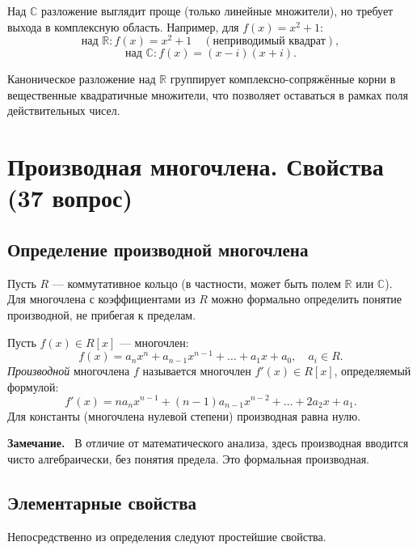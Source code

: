 \documentclass[a4paper,12pt]{article}
\newcommand{\myremark}{\textbf{Замечание.}\ }
\theoremstyle{definition}
\theoremstyle{plain}
\theoremstyle{remark}
\begin{document}
	Над \(\mathbb{C}\) разложение выглядит проще (только линейные множители), но требует выхода в комплексную область. Например, для \(f(x) = x^2 + 1\):
	\[
	\text{над } \mathbb{R}: f(x) = x^2 + 1 \quad (\text{неприводимый квадрат}),
	\]
	\[
	\text{над } \mathbb{C}: f(x) = (x - i)(x + i).
	\]
	
	Каноническое разложение над \(\mathbb{R}\) группирует комплексно-сопряжённые корни в вещественные квадратичные множители, что позволяет оставаться в рамках поля действительных чисел.
	
	
	
	
	
	
	\newpage
	\section{Производная многочлена. Свойства (37 вопрос)}
	
	\subsection{Определение производной многочлена}
	
	Пусть \( R \) — коммутативное кольцо (в частности, может быть полем \(\mathbb{R}\) или \(\mathbb{C}\)). Для многочлена с коэффициентами из \( R \) можно формально определить понятие производной, не прибегая к пределам.
	
	\begin{tcolorbox}[colback=blue!5, colframe=blue!40!black, title=Определение]
		Пусть \( f(x) \in R[x] \) — многочлен:
		\[
		f(x) = a_n x^n + a_{n-1} x^{n-1} + \dots + a_1 x + a_0, \quad a_i \in R.
		\]
		\textit{Производной} многочлена \( f \) называется многочлен \( f'(x) \in R[x] \), определяемый формулой:
		\[
		f'(x) = n a_n x^{n-1} + (n-1) a_{n-1} x^{n-2} + \dots + 2a_2 x + a_1.
		\]
		Для константы (многочлена нулевой степени) производная равна нулю.
	\end{tcolorbox}
	
	\myremark
	В отличие от математического анализа, здесь производная вводится чисто алгебраически, без понятия предела. Это формальная производная.
	
	\subsection{Элементарные свойства}
	
	Непосредственно из определения следуют простейшие свойства.
	
\end{document}
